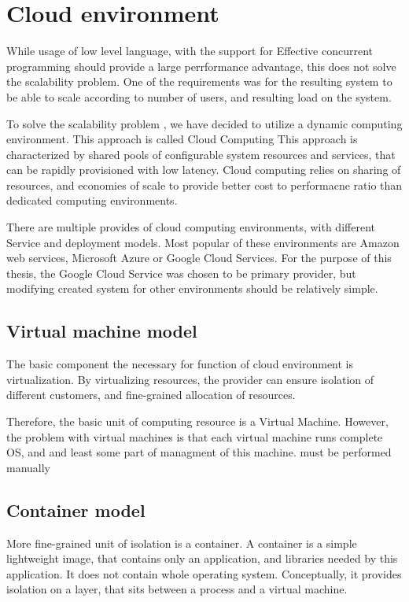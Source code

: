 \section{Cloud environment}
While usage of low level language, with the support for Effective concurrent programming should provide a large perrformance
advantage, this does not solve the scalability problem. One of the requirements was for the resulting system to
be able to scale according to number of users, and resulting load on the system.

To solve the scalability problem , we have decided to utilize a dynamic computing environment. This approach is called Cloud Computing\cite{wiki:cloud}
This approach is characterized by shared pools of configurable system resources and services, that can be rapidly provisioned
with low latency. Cloud computing relies on sharing of resources, and economies of scale to provide better
cost to performacne ratio than dedicated computing environments.

There are multiple provides of cloud computing environments, with different Service and deployment models.
Most popular of these environments are Amazon web services, Microsoft Azure or Google Cloud Services. For the purpose of
this thesis, the Google Cloud Service was chosen to be primary provider, but modifying created system for other
environments should be relatively simple.

\subsection{Virtual machine model}
The basic component the necessary for function of cloud environment is virtualization. By virtualizing resources,
the provider can ensure isolation of different customers, and fine-grained allocation of resources.

Therefore, the basic unit of computing resource is a Virtual Machine. However, the problem with virtual machines
is that each virtual machine runs complete OS, and and least some part of managment of this machine.
must be performed manually

\subsection{Container model}
More fine-grained unit of isolation is a container. A container is a simple lightweight image, that contains
only an application, and libraries needed by this application. It does not contain whole operating system.
Conceptually, it provides isolation on a layer, that sits between a process and a virtual machine.

